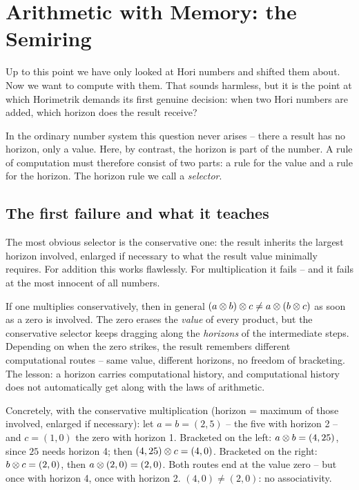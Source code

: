 \chapter{Arithmetic with Memory: the Semiring}
\label{ch:arithmetik}


Up to this point we have only looked at Hori numbers and shifted
them about. Now we want to compute with them. That sounds harmless,
but it is the point at which Horimetrik demands its first genuine
decision: when two Hori numbers are added, which horizon does the
result receive?

In the ordinary number system this question never arises -- there a
result has no horizon, only a value. Here, by contrast, the horizon
is part of the number. A rule of computation must therefore consist
of two parts: a rule for the value and a rule for the horizon. The
horizon rule we call a \emph{selector}.

\section{The first failure and what it teaches}

The most obvious selector is the conservative one: the result
inherits the largest horizon involved, enlarged if necessary to
what the result value minimally requires. For addition this works
flawlessly. For multiplication it fails -- and it fails at the most
innocent of all numbers.

\begin{sackgasse}
If one multiplies conservatively, then in general
$(a\otimes b)\otimes c\ne a\otimes(b\otimes c)$ as soon as a zero
is involved. The zero erases the \emph{value} of every product, but
the conservative selector keeps dragging along the \emph{horizons}
of the intermediate steps. Depending on when the zero strikes, the
result remembers different computational routes -- same value,
different horizons, no freedom of bracketing. The lesson: a horizon
carries computational history, and computational history does not
automatically get along with the laws of arithmetic.
\end{sackgasse}

\begin{beispiel}
Concretely, with the conservative multiplication (horizon = maximum
of those involved, enlarged if necessary): let $a=b=(2,5)$ -- the
five with horizon 2 -- and $c=(1,0)$ the zero with horizon 1.
Bracketed on the left: $a\otimes b=(4,25)$, since $25$ needs
horizon 4; then $(4,25)\otimes c=(4,0)$. Bracketed on the right:
$b\otimes c=(2,0)$, then $a\otimes(2,0)=(2,0)$. Both routes end at
the value zero -- but once with horizon 4, once with horizon 2.
$(4,0)\ne(2,0)$: no associativity.
\end{beispiel}

